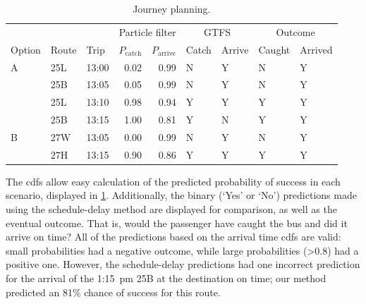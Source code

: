 \begin{knitrout}\small
{}\color{fgcolor}\begin{table}

\caption{\label{tab:eta_journey_results}Journey planning.}
\centering
\fontsize{8}{10}\selectfont
\begin{tabular}[t]{lllrrllll}
\toprule
\multicolumn{1}{c}{} & \multicolumn{1}{c}{} & \multicolumn{1}{c}{} & \multicolumn{2}{c}{Particle filter} & \multicolumn{2}{c}{GTFS} & \multicolumn{2}{c}{Outcome} \\
\cmidrule(l{3pt}r{3pt}){4-5} \cmidrule(l{3pt}r{3pt}){6-7} \cmidrule(l{3pt}r{3pt}){8-9}
Option & Route & Trip & $P_\text{catch}$ & $P_\text{arrive}$ & Catch & Arrive & Caught & Arrived\\
\midrule
A & 25L & 13:00 & 0.02 & 0.99 & N & Y & N & Y\\
 & 25B & 13:05 & 0.05 & 0.99 & N & Y & N & Y\\
 & 25L & 13:10 & 0.98 & 0.94 & Y & Y & Y & Y\\
 & 25B & 13:15 & 1.00 & 0.81 & Y & N & Y & Y\\
\midrule
B & 27W & 13:05 & 0.00 & 0.99 & N & Y & N & Y\\
 & 27H & 13:15 & 0.90 & 0.86 & Y & Y & Y & Y\\
\bottomrule
\end{tabular}
\end{table}


\end{knitrout}


The \glspl{cdf} allow easy calculation of the predicted probability of success in each scenario, displayed in \cref{tab:eta_journey_results}. Additionally, the binary (`Yes' or `No') predictions made using the schedule-delay method are displayed for comparison, as well as the eventual outcome. That is, would the passenger have caught the bus and did it arrive on time? All of the predictions based on the \pf{} arrival time \glspl{cdf} are valid: small probabilities had a negative outcome, while large probabilities (>0.8) had a positive one. However, the schedule-delay predictions had one incorrect prediction for the arrival of the 1:15~pm 25B at the destination on time; our method predicted an 81\% chance of success for this route.


